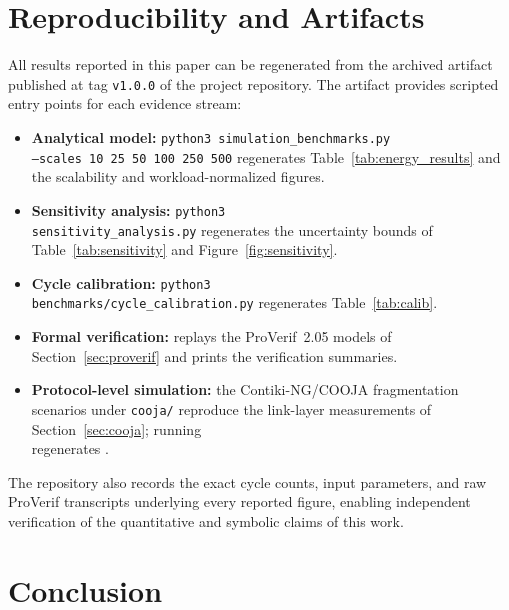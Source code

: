 \documentclass[journal]{IEEEtran}
\begin{document}
\section{Reproducibility and Artifacts}
\label{sec:reproducibility}

All results reported in this paper can be regenerated from the archived artifact
published at tag \texttt{v1.0.0} of the
project repository. The artifact
provides scripted entry points for each evidence stream:
\begin{itemize}
  \item \textbf{Analytical model:} \texttt{python3 simulation\_benchmarks.py}\\
        \texttt{--scales 10 25 50 100 250 500} regenerates
        Table~\ref{tab:energy_results} and the scalability and
        workload-normalized figures.
  \item \textbf{Sensitivity analysis:} \texttt{python3}\\
        \texttt{sensitivity\_analysis.py} regenerates the uncertainty bounds of
        Table~\ref{tab:sensitivity} and Figure~\ref{fig:sensitivity}.
  \item \textbf{Cycle calibration:} \texttt{python3}\\
        \texttt{benchmarks/cycle\_calibration.py} regenerates Table~\ref{tab:calib}.
  \item \textbf{Formal verification:}  replays the
        ProVerif~2.05 models of
        Section~\ref{sec:proverif} and prints the verification summaries.
  \item \textbf{Protocol-level simulation:} the Contiki-NG/COOJA fragmentation
        scenarios under \texttt{cooja/} reproduce the link-layer measurements of
        Section~\ref{sec:cooja}; running\\
         regenerates
        .
\end{itemize}

The repository also records the exact cycle counts, input parameters, and raw
ProVerif transcripts underlying every reported figure, enabling independent
verification of the quantitative and symbolic claims of this work.


\section{Conclusion}
\end{document}
